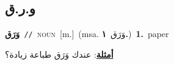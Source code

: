 \documentclass[10pt,a4paper,twoside]{article} %
\begin{document}
\begin{multicols}{2}
\vspace{-3mm}
\subsection*{\color{blue}\foreignlanguage{arabic}{و.ر.ق}\color{blue}{}} 

{\setlength\topsep{0pt}\textbf{\foreignlanguage{arabic}{وَرَق}}\ {\color{gray}\texttt{//}\color{black}}\ \textsc{noun}\ [m.]\ \color{gray}(msa. \foreignlanguage{arabic}{وَرَق}~\foreignlanguage{arabic}{\textbf{١.}})\color{black}\ \textbf{1.}~paper\  \begin{flushright}\color{gray}\foreignlanguage{arabic}{\textbf{\underline{\foreignlanguage{arabic}{أمثلة}}}: عندك وَرَق طباعة زيادة؟}\end{flushright}\color{black}} \vspace{2mm}


\end{multicols}
\end{document}
